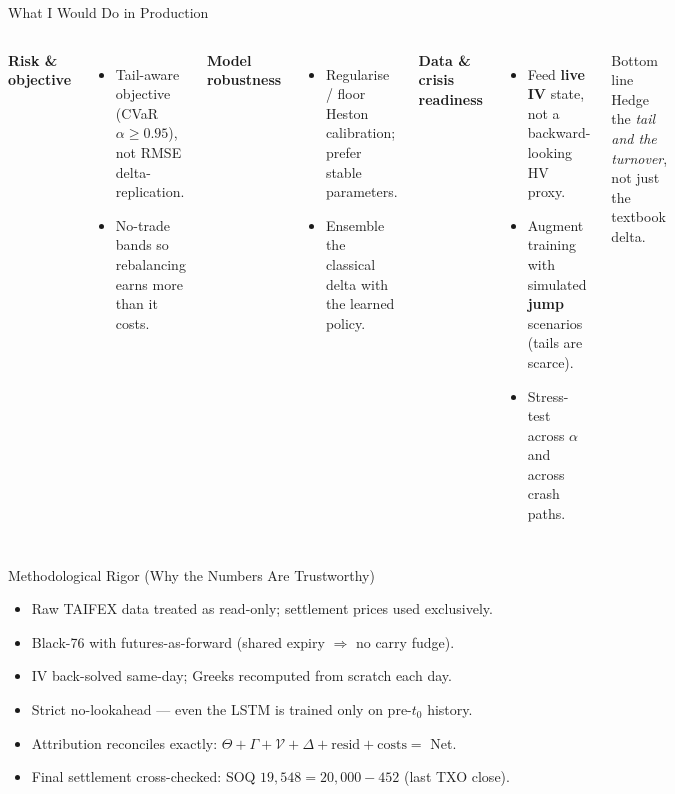 \documentclass[aspectratio=169,t]{beamer}
\begin{document}
\begin{frame}{What I Would Do in Production}
  \begin{columns}[T]
      \textbf{Risk \& objective}
      \begin{itemize}\small
        \item Tail-aware objective (CVaR $\alpha\!\ge\!0.95$), not RMSE delta-replication.
        \item No-trade bands so rebalancing earns more than it costs.
      \end{itemize}
      \textbf{Model robustness}
      \begin{itemize}\small
        \item Regularise / floor Heston calibration; prefer stable parameters.
        \item Ensemble the classical delta with the learned policy.
      \end{itemize}
      \textbf{Data \& crisis readiness}
      \begin{itemize}\small
        \item Feed \textbf{live IV} state, not a backward-looking HV proxy.
        \item Augment training with simulated \textbf{jump} scenarios (tails are scarce).
        \item Stress-test across $\alpha$ and across crash paths.
      \end{itemize}
      \begin{block}{Bottom line}
        \small Hedge the \emph{tail and the turnover}, not just the textbook delta.
      \end{block}
  \end{columns}
\end{frame}

\begin{frame}{Methodological Rigor (Why the Numbers Are Trustworthy)}
  \begin{itemize}
    \item Raw TAIFEX data treated as read-only; settlement prices used exclusively.
    \item Black-76 with futures-as-forward (shared expiry $\Rightarrow$ no carry fudge).
    \item IV back-solved same-day; Greeks recomputed from scratch each day.
    \item Strict no-lookahead --- even the LSTM is trained only on pre-$t_0$ history.
    \item Attribution reconciles exactly: $\Theta+\Gamma+\mathcal{V}+\Delta+\text{resid}+\text{costs}=$ Net.
    \item Final settlement cross-checked: SOQ $19{,}548 = 20{,}000-452$ (last TXO close).
  \end{itemize}
\end{frame}
\end{document}
